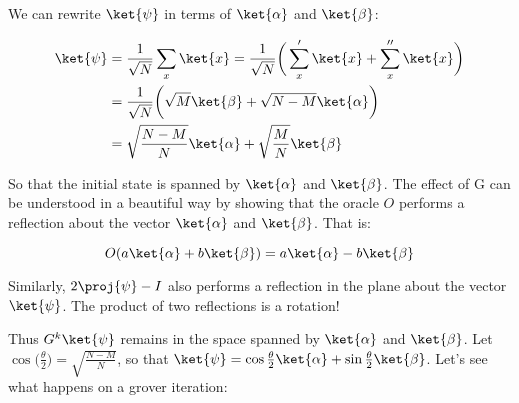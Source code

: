We can rewrite $\ket{\psi}$ in terms of $\ket{\alpha}$ and $\ket{\beta}$:

\begin{equation}
    \begin{split}
    \ket{\psi} & =  \frac{1}{\sqrt{N}} \sum_x \ket{x}  = \frac{1}{\sqrt{N}} \bigg( \sum_x ' \ket{x} + \sum_x '' \ket{x} \bigg)  \\
     & = \frac{1}{\sqrt{N}} \bigg( \sqrt{M} \ket{\beta} + \sqrt{N-M} \ket{\alpha} \bigg) \\
     & = \sqrt{\frac{N-M}{N}} \ket{\alpha} + \sqrt{\frac{M}{N}} \ket{\beta}
    \end{split}
\end{equation}

So that the initial state is spanned by $\ket{\alpha}$ and $\ket{\beta}$. The effect of G can be understood in a beautiful way by showing that the oracle $O$ performs a reflection about the vector $\ket{\alpha}$ and $\ket{\beta}$. That is:

\begin{equation}
    O ( a \ket{\alpha} + b \ket{\beta}) = a \ket{\alpha} - b \ket{\beta}
\end{equation}

Similarly, $2 \proj{\psi} - I$ also performs a reflection in the plane about the vector $\ket{\psi}$. The product of two reflections is a rotation!

Thus $G^k\ket{\psi}$ remains in the space spanned by $\ket{\alpha}$ and $\ket{\beta}$. Let $\cos \big( \frac{\theta}{2} \big) = \sqrt{\frac{N- M}{N}}$, so that $\ket{\psi} = \cos \frac{\theta}{2} \ket{\alpha} + \sin \frac{\theta}{2} \ket{\beta}$. Let's see what happens on a grover iteration:

